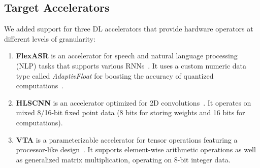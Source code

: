 \subsection{Target Accelerators}
\label{sec.eval-acc}

We added support for three DL accelerators that provide hardware operators at different levels of granularity:
\begin{enumerate}[leftmargin=*]

\item \textbf{FlexASR} is an accelerator for speech and natural language processing (NLP) tasks that supports various RNNs~\cite{tambe20219}.
%
It uses a custom numeric data type called \textit{AdaptivFloat} for boosting the accuracy of quantized computations~\cite{tambe2020algorithm}.
%
%
%


\item \textbf{HLSCNN} is an accelerator optimized for 2D convolutions~\cite{whatmough201916nm}.
%
%
It operates on mixed 8/16-bit fixed point data
(8 bits for storing weights and 16 bits for computations).
%

\item \textbf{VTA} is a parameterizable accelerator for tensor operations featuring a processor-like design~\cite{moreau2019hardware}.
%
It supports element-wise arithmetic operations as well as generalized matrix multiplication,
operating on 8-bit integer data.
%


\end{enumerate}
